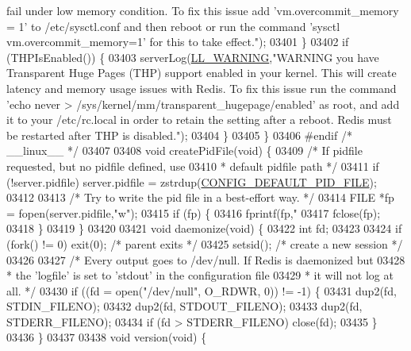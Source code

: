 \begin{DoxyCode}
{{{{{{{{{{{{{{{{{{{{{{{{{{{{{{{{{{{{{{{{{{{{{{{{{{{{{{{{{{{{{{{{{{{{{{{{{{{{{{{{{{{{{{{{{{{{{{{{{{{{{{{{{{{{{{{{{{{{{{{{{{{{{{{{{{{{{{{{{{{{{{{{{{{{{{{{{{{{{{{{{{{{{{{{{{       fail under low memory condition. To fix this issue add 'vm.overcommit\_memory = 1' to /etc/sysctl.conf and then
       reboot or run the command 'sysctl vm.overcommit\_memory=1' for this to take effect."});
03401     \}
03402     \textcolor{keywordflow}{if} (THPIsEnabled()) \{
03403         serverLog(\hyperlink{server_8h_a31229b9334bba7d6be2a72970967a14b}{LL\_WARNING},\textcolor{stringliteral}{"WARNING you have Transparent Huge Pages (THP) support enabled
       in your kernel. This will create latency and memory usage issues with Redis. To fix this issue run the
       command 'echo never > /sys/kernel/mm/transparent\_hugepage/enabled' as root, and add it to your /etc/rc.local in
       order to retain the setting after a reboot. Redis must be restarted after THP is disabled."});
03404     \}
03405 \}
03406 \textcolor{preprocessor}{#}\textcolor{preprocessor}{endif} \textcolor{comment}{/* \_\_linux\_\_ */}
03407 
03408 \textcolor{keywordtype}{void} createPidFile(\textcolor{keywordtype}{void}) \{
03409     \textcolor{comment}{/* If pidfile requested, but no pidfile defined, use}
03410 \textcolor{comment}{     * default pidfile path */}
03411     \textcolor{keywordflow}{if} (!server.pidfile) server.pidfile = zstrdup(\hyperlink{server_8h_ad0a549a4ce81a4436199706f3513bbc2}{CONFIG\_DEFAULT\_PID\_FILE});
03412 
03413     \textcolor{comment}{/* Try to write the pid file in a best-effort way. */}
03414     FILE *fp = fopen(server.pidfile,\textcolor{stringliteral}{"w"});
03415     \textcolor{keywordflow}{if} (fp) \{
03416         fprintf(fp,\textcolor{stringliteral}{"%
03417         fclose(fp);
03418     \}
03419 \}
03420 
03421 \textcolor{keywordtype}{void} daemonize(\textcolor{keywordtype}{void}) \{
03422     \textcolor{keywordtype}{int} fd;
03423 
03424     \textcolor{keywordflow}{if} (fork() != 0) exit(0); \textcolor{comment}{/* parent exits */}
03425     setsid(); \textcolor{comment}{/* create a new session */}
03426 
03427     \textcolor{comment}{/* Every output goes to /dev/null. If Redis is daemonized but}
03428 \textcolor{comment}{     * the 'logfile' is set to 'stdout' in the configuration file}
03429 \textcolor{comment}{     * it will not log at all. */}
03430     \textcolor{keywordflow}{if} ((fd = open(\textcolor{stringliteral}{"/dev/null"}, O\_RDWR, 0)) != -1) \{
03431         dup2(fd, STDIN\_FILENO);
03432         dup2(fd, STDOUT\_FILENO);
03433         dup2(fd, STDERR\_FILENO);
03434         \textcolor{keywordflow}{if} (fd > STDERR\_FILENO) close(fd);
03435     \}
03436 \}
03437 
03438 \textcolor{keywordtype}{void} version(\textcolor{keywordtype}{void}) \{
}}}}}}}}}}}}}}}}}}}}}}}}}}}}}}}}}}}}}}}}}}}}}}}}}}}}}}}}}}}}}}}}}}}}}}}}}}}}}}}}}}}}}}}}}}}}}}}}}}}}}}}}}}}}}}}}}}}}}}}}}}}}}}}}}}}}}}}}}}}}}}}}}}}}}}}}}}}}}}}}}}}}}}}}}}
\end{DoxyCode}
